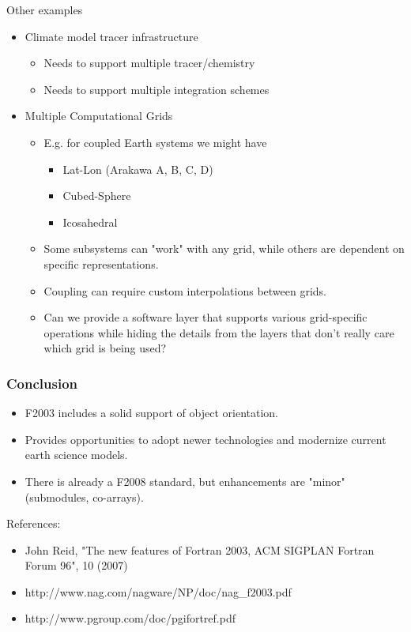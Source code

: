 \documentclass[11pt]{beamer}
\newcommand\FontCcolumn{\fontsize{10}{7.2}\selectfont}
\begin{document}

\begin{frame}{Other examples}

\begin{itemize}

  \item Climate model tracer infrastructure
  \begin{itemize}
  \item Needs to support multiple tracer/chemistry
  \item Needs to support multiple integration schemes   
  \end{itemize}
  
  \item Multiple Computational Grids

  \begin{itemize}
  \item E.g. for coupled Earth systems we might have
  \begin{itemize}
  \item Lat-Lon (Arakawa A, B, C, D)
  \item Cubed-Sphere
  \item Icosahedral
   \end{itemize}
   \item Some subsystems can "work" with any grid, while others are dependent on specific representations.
   \item Coupling can require custom interpolations between grids.
   \item Can we provide a software layer that supports various grid-specific operations while hiding the details from the layers that don't really care which grid is being used?
   \end{itemize}

 \end{itemize}

\end{frame}


\begin{frame}[fragile]
\frametitle{Conclusion}

\FontCcolumn

\begin{itemize}
\item F2003 includes a solid support of object orientation.
\item Provides opportunities to adopt newer technologies and modernize current earth science models.
\item There is already a F2008 standard, but enhancements are "minor" (submodules, co-arrays).
\end{itemize}

\bigskip
References:
\begin{itemize}
\item John Reid, "The new features of Fortran 2003, ACM SIGPLAN Fortran Forum 96", 10 (2007)
\item http://www.nag.com/nagware/NP/doc/nag\_f2003.pdf
\item http://www.pgroup.com/doc/pgifortref.pdf
\end{itemize}
\end{frame}
\end{document}
